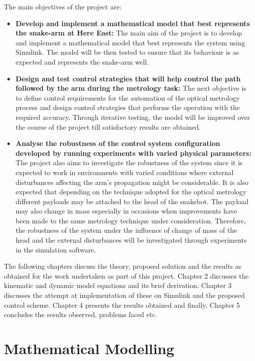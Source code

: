 \documentclass[a4paper,12pt]{report}
\begin{document}
The main objectives of the project are:
\begin{itemize}
	\item \textbf{Develop and implement a mathematical model that best represents the snake-arm at Here East:} The main aim of the project is to develop and implement a mathematical model that best represents the system using Simulink. The model will be then tested to ensure that its behaviour is as expected and represents the snake-arm well.
	\item \textbf{Design and test control strategies that will help control the path followed by the arm during the metrology task:} The next objective is to define control requirements for the automation of the optical metrology process and design control strategies that performs the operation with the required accuracy. Through iterative testing, the model will be improved over the course of the project till satisfactory results are obtained.
	\item \textbf{Analyse the robustness of the control system configuration developed by running experiments with varied physical parameters:} The project also aims to investigate the robustness of the system since it is expected to work in environments with varied conditions where external disturbances affecting the arm’s propagation might be considerable. It is also expected that depending on the technique adopted for the optical metrology different payloads may be attached to the head of the snakebot. The payload may also change in mass especially in occasions when improvements have been made to the same metrology technique under consideration. Therefore, the robustness of the system under the influence of change of mass of the head and the external disturbances will be investigated through experiments in the simulation software.
\end{itemize}

The following chapters discuss the theory, proposed solution and the results as obtained for the work undertaken as part of this project. Chapter 2 discusses the kinematic and dynamic model equations and its brief derivation. Chapter 3 discusses the attempt at implementation of these on Simulink and the proposed control scheme. Chapter 4 presents the results obtained and finally, Chapter 5 concludes the results observed, problems faced etc.


\chapter{Mathematical Modelling}
\end{document}
